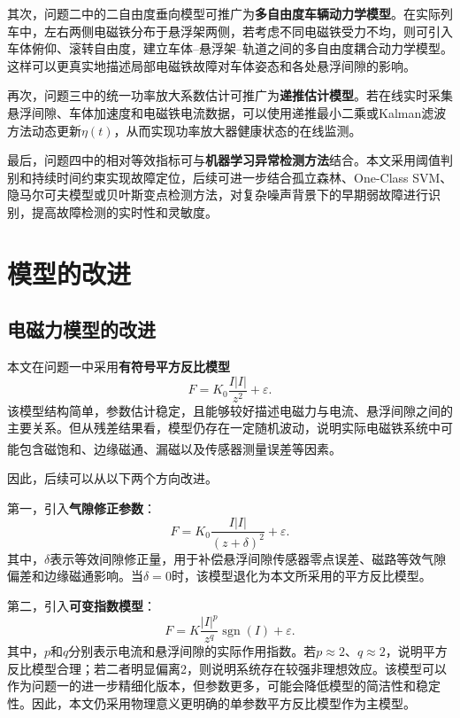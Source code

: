 \documentclass[a4paper]{nmmcm}
\newcommand{\upcite}[1]{\textsuperscript{\cite{#1}}}
\begin{document}
其次，问题二中的二自由度垂向模型可推广为\textbf{多自由度车辆动力学模型}。在实际列车中，左右两侧电磁铁分布于悬浮架两侧，若考虑不同电磁铁受力不均，则可引入车体俯仰、滚转自由度，建立车体--悬浮架--轨道之间的多自由度耦合动力学模型。这样可以更真实地描述局部电磁铁故障对车体姿态和各处悬浮间隙的影响。

再次，问题三中的统一功率放大系数估计可推广为\textbf{递推估计模型}。若在线实时采集悬浮间隙、车体加速度和电磁铁电流数据，可以使用递推最小二乘或Kalman滤波方法动态更新$\eta(t)$，从而实现功率放大器健康状态的在线监测。

最后，问题四中的相对等效指标可与\textbf{机器学习异常检测方法}结合。本文采用阈值判别和持续时间约束实现故障定位，后续可进一步结合孤立森林、One-Class SVM、隐马尔可夫模型或贝叶斯变点检测方法，对复杂噪声背景下的早期弱故障进行识别，提高故障检测的实时性和灵敏度。

\section{模型的改进}

\subsection{电磁力模型的改进}

本文在问题一中采用\textbf{有符号平方反比模型}
\begin{equation}
F=K_0\frac{I|I|}{z^2}+\varepsilon.
\end{equation}
该模型结构简单，参数估计稳定，且能够较好描述电磁力与电流、悬浮间隙之间的主要关系。但从残差结果看，模型仍存在一定随机波动，说明实际电磁铁系统中可能包含磁饱和、边缘磁通、漏磁以及传感器测量误差等因素\upcite{2}\upcite{3}。

因此，后续可以从以下两个方向改进。

第一，引入\textbf{气隙修正参数}：
\begin{equation}
F=K_0\frac{I|I|}{(z+\delta)^2}+\varepsilon.
\end{equation}
其中，$\delta$表示等效间隙修正量，用于补偿悬浮间隙传感器零点误差、磁路等效气隙偏差和边缘磁通影响。当$\delta=0$时，该模型退化为本文所采用的平方反比模型。

第二，引入\textbf{可变指数模型}：
\begin{equation}
F=K\frac{|I|^p}{z^q}\operatorname{sgn}(I)+\varepsilon.
\end{equation}
其中，$p$和$q$分别表示电流和悬浮间隙的实际作用指数。若$p\approx2$、$q\approx2$，说明平方反比模型合理；若二者明显偏离2，则说明系统存在较强非理想效应。该模型可以作为问题一的进一步精细化版本，但参数更多，可能会降低模型的简洁性和稳定性。因此，本文仍采用物理意义更明确的单参数平方反比模型作为主模型。
\end{document}
